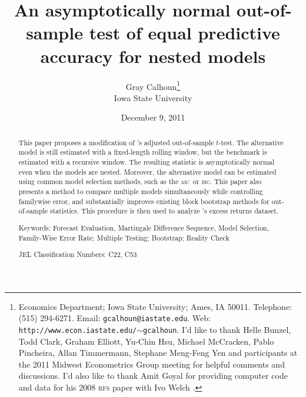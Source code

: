 \documentclass[11pt,fleqn]{article}
\newcommand\citepos[2][]{\citeauthor{#2}'s \citeyearpar[#1]{#2}}
\theoremstyle{definition}
\newcommand{\aic}{\textsc{aic}}
\newcommand{\bic}{\textsc{bic}}
\begin{document}
\author{Gray Calhoun\thanks{ Economics Department; Iowa State
    University; Ames, IA 50011.  Telephone: (515) 294-6271.  Email:
    \texttt{gcalhoun@iastate.edu}.  Web:
    \texttt{http://www.econ.iastate.edu/$\sim$gcalhoun}.  I'd like to
    thank Helle Bunzel, Todd Clark, Graham Elliott, Yu-Chin Hsu,
    Michael McCracken, Pablo Pincheira, Allan Timmermann, Stephane
    Meng-Feng Yen and participants at the 2011 Midwest Econometrics
    Group meeting for helpful comments and discussions.  I'd also like to thank Amit
    Goyal for providing computer code and data for his 2008
    \textsc{rfs} paper with Ivo
    Welch \citep{GoW:08}.} \\
  Iowa State University}

\title{An asymptotically normal out-of-sample
  test of equal predictive accuracy for nested models} 

\date{December 9, 2011}

\maketitle

\begin{abstract} 
  \noindent This paper proposes a modification of \citepos[\textit{J.
    Econom.}]{ClW:07} adjusted out-of-sample $t$-test.  The
  alternative model is still estimated with a fixed-length rolling
  window, but the benchmark is estimated with a recursive window. The
  resulting statistic is asymptotically normal even when the models
  are nested.  Moreover, the alternative model can be estimated using
  common model selection methods, such as the \aic\ or \bic.  This
  paper also presents a method to compare multiple models
  simultaneously while controlling familywise error, and
  substantially improves existing block bootstrap methods for
  out-of-sample statistics.  This procedure is then used to analyze
  \citepos[\textit{Rev. Finan. Stud.}]{GoW:08} excess returns dataset.

\strut

\noindent Keywords: Forecast Evaluation, Martingale Difference
Sequence, Model Selection, Family-Wise Error Rate; Multiple Testing;
Bootstrap; Reality Check

\strut

\noindent JEL Classification Numbers: C22, C53

\end{abstract}

\newpage 
\end{document}
